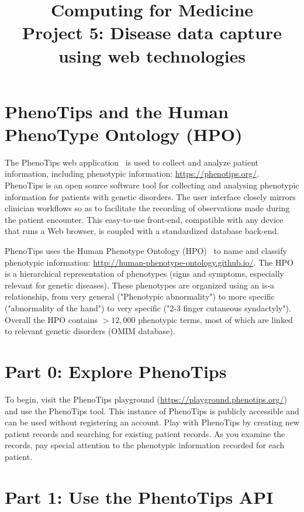 \documentclass[a4paper]{article}
\title{Computing for Medicine \\ \Large Project 5: Disease data capture using web technologies}
\author{}
\date{}
\begin{document}
\newcommand{\error}[1]{\textcolor{red}{#1}}

\maketitle

\section{PhenoTips and the Human PhenoType Ontology (HPO)}

The PhenoTips web application~\cite{phenotips} is used to collect and analyze patient information, including phenotypic information: \url{https://phenotips.org/}. PhenoTips is an open source software tool for collecting and analysing phenotypic information for patients with genetic disorders. The user interface closely mirrors clinician workflows so as to facilitate the recording of observations made during the patient encounter. This easy-to-use front-end, compatible with any device that runs a Web browser, is coupled with a standardized database back-end. 

PhenoTips  uses the Human Phenotype Ontology (HPO)~\cite{hpo} to name and classify phenotypic information: \url{http://human-phenotype-ontology.github.io/}. The HPO is a hierarchical representation of phenotypes (signs and symptoms, especially relevant for genetic diseases). These phenotypes are organized using an is-a relationship, from very general ("Phenotypic abnormality") to more specific ("abnormality of the hand") to very specific ("2-3 finger cutaneous syndactyly"). Overall the HPO contains $>12,000$ phenotypic terms, most of which are linked to relevant genetic disorders (OMIM database).  

\section{Part 0: Explore PhenoTips}

To begin, visit the PhenoTips playground (\url{https://playground.phenotips.org/}) and use the PhenoTips tool.  This instance of PhenoTips is publicly accessible and can be used without registering an account. Play with PhenoTips by creating new patient records and searching for existing patient records.  As you examine the records, pay special attention to the phenotypic information recorded for each patient.

\section{Part 1: Use the PhentoTips API}
\end{document}

